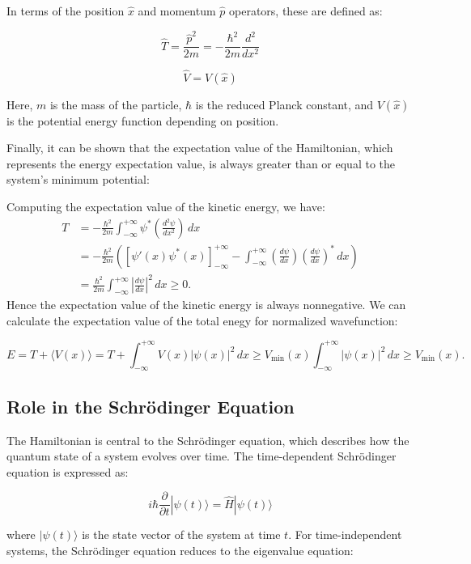 In terms of the position \( \hat{x} \) and momentum \( \hat{p} \) operators, these are defined as:

\[
\hat{T} = \frac{\hat{p}^2}{2m} = -\frac{\hbar^2}{2m} \frac{d^2}{dx^2}
\]

\[
\hat{V} = V(\hat{x})
\]

Here, \( m \) is the mass of the particle, \( \hbar \) is the reduced Planck constant, and \( V(\hat{x}) \) is the potential energy function depending on position.

Finally, it can be shown that the expectation value of the Hamiltonian, which represents the energy expectation value, is always greater than or equal to the system's minimum potential:\cite{wiki:hamiltonian_quantum_mechanics}

Computing the expectation value of the kinetic energy, we have:
\[
\begin{aligned}
T &= -\frac{\hbar^2}{2m} \int_{-\infty}^{+\infty} \psi^* \left( \frac{d^2 \psi}{dx^2} \right) \, dx \\ 
  &= -\frac{\hbar^2}{2m} \left( \left[ \psi'(x) \psi^*(x) \right]_{-\infty}^{+\infty} 
      - \int_{-\infty}^{+\infty} \left( \frac{d\psi}{dx} \right) 
      \left( \frac{d\psi}{dx} \right)^* \, dx \right) \\ 
  &= \frac{\hbar^2}{2m} \int_{-\infty}^{+\infty} \left| \frac{d\psi}{dx} \right|^2 \, dx \geq 0.
\end{aligned}
\]
Hence the expectation value of the kinetic energy is always non\-negative. We can calculate the expectation value of the total enegy for normalized wavefunction:

\[
E = T + \langle V(x) \rangle = T + \int_{-\infty}^{+\infty} V(x) |\psi(x)|^2 \, dx 
\geq V_{\text{min}}(x) \int_{-\infty}^{+\infty} |\psi(x)|^2 \, dx \geq V_{\text{min}}(x).
\]


\subsection{Role in the Schrödinger Equation}

The Hamiltonian is central to the Schrödinger equation, which describes how the quantum state of a system evolves over time. The time-dependent Schrödinger equation is expressed as:

\[
i\hbar \frac{\partial}{\partial t} |\psi(t)\rangle = \hat{H} |\psi(t)\rangle
\]

where \( |\psi(t)\rangle \) is the state vector of the system at time \( t \). For time-independent systems, the Schrödinger equation reduces to the eigenvalue equation:

